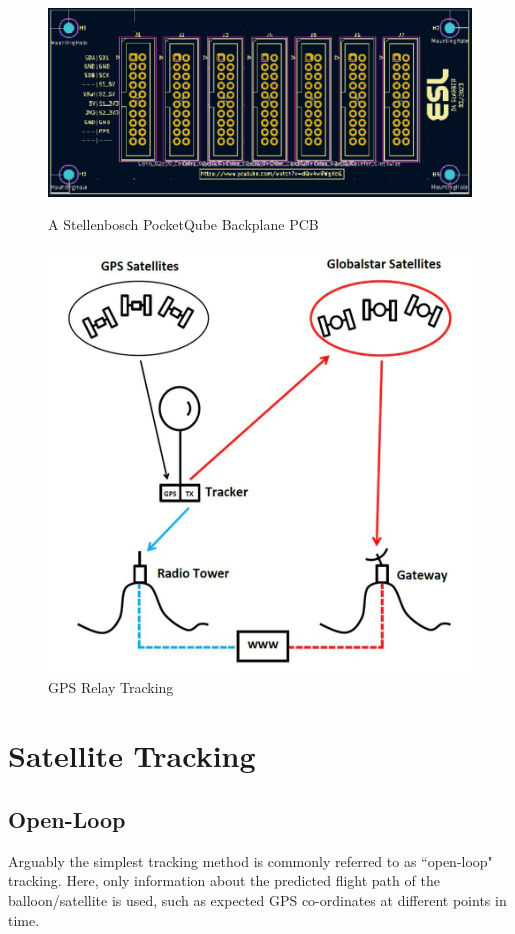 \graphicspath{{./figures/}}

\begin{figure}[!htb]
  \begin{minipage}{.49\textwidth}
    \centering
    \includegraphics[width=0.98\linewidth]{pq_backplane}
    \caption{A Stellenbosch PocketQube Backplane PCB \cite{standard-pqsu}}
    \label{fig:pq_backplane}
  \end{minipage}
  \begin{minipage}{.49\textwidth}
    \centering
    \includegraphics[width=0.65\linewidth]{gps_relay}
    \caption{GPS Relay Tracking \cite{site-highaltitudescienceTrackingWeather}}
    \label{fig:gps_relay}
  \end{minipage}
\end{figure}

\section{Satellite Tracking}

\subsection{Open-Loop}
Arguably the simplest tracking method is commonly referred to as ``open-loop" tracking. Here, only information about the predicted flight path of the balloon/satellite is used, such as expected GPS co-ordinates at different points in time.

